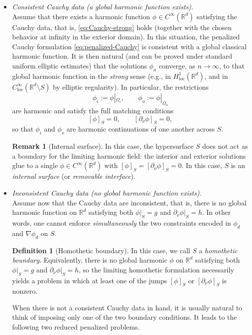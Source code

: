 \documentclass[preprint,12pt]{elsarticle}
\theoremstyle{plain}
\theoremstyle{definition}
\newtheorem{definition}[theorem]{Definition}
\newtheorem{remark}[theorem]{Remark}
\theoremstyle{note}
\newcommand{\R}{\mathbb{R}}
\begin{document}
\begin{itemize}
\item[\it{(A)}] \emph{Consistent Cauchy data (a global harmonic function exists).} \\
Assume that there exists a harmonic function $\phi\in C^\infty(\R^d)$ satisfying the Cauchy data,
that is, \eqref{eq:Cauchy-strong} holds (together with the chosen behavior at infinity in the
exterior domain). In this situation, the penalized Cauchy formulation \eqref{eq:penalized-Cauchy} is consistent with a global classical harmonic function. It is then natural (and can be proved under standard uniform elliptic estimates) that the solutions $\phi_n$ converge, as $n\to\infty$, to that global harmonic function in the \emph{strong} sense (e.g., in $H^1_{\mathrm{loc}}(\R^d)$, and in $C^\infty_{\mathrm{loc}}(\R^d\setminus S)$ by elliptic regularity). In particular, the restrictions
\[
\phi_i := \phi|_{\Omega_i},\qquad \phi_o := \phi|_{\Omega_o}
\]
are harmonic and satisfy the full matching conditions
\[
[\phi]_S=0,\qquad [\partial_\nu\phi]_S=0,
\]
so that $\phi_i$ and $\phi_o$ are harmonic continuations of one another across $S$.

\begin{remark}[Internal surface] In this case, the hypersurface $S$ does not act as a boundary for the limiting harmonic field: the interior and exterior solutions glue to a single $\phi\in C^\infty(\R^d)$ with $[\phi]_S=[\partial_\nu\phi]_S=0$. In this case, $S$ is an \emph{internal surface} (or \emph{removable interface}).
\end{remark}

\item[\it(B)] \emph{Inconsistent Cauchy data (no global harmonic function exists).}\\
Assume now that the Cauchy data are inconsistent, that is, there is no global harmonic function on
$\R^d$ satisfying both $\phi|_S=g$ and $\partial_\nu\phi|_S=h$. In other words, one cannot enforce \emph{simultaneously} the two constraints encoded in $\phi_d$ and $\nabla\phi_d$ on $S$.

\begin{definition}[Homothetic boundary] In this case, we call $S$ a \emph{homothetic boundary}. Equivalently, there is no global harmonic $\phi$ on $\R^d$ satisfying both $\phi|_S=g$ and $\partial_\nu\phi|_S=h$, so the limiting homothetic formulation necessarily yields a problem in which at least one of the jumps $[\phi]_S$ or $[\partial_\nu\phi]_S$ is nonzero.
\end{definition}

When there is not a consistent Cauchy data in hand, it is usually natural to think of imposing only one of the two boundary conditions. It leads to the following two reduced penalized problems.
\end{itemize}
\end{document}

